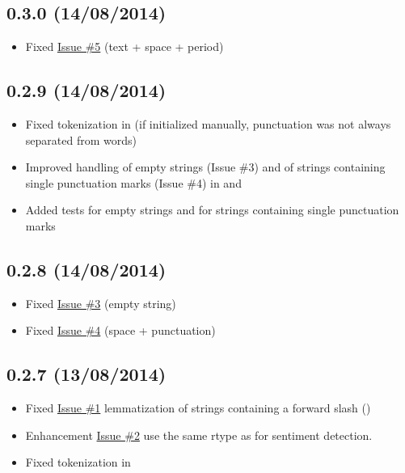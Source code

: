 \documentclass[letterpaper,10pt,english]{sphinxmanual}
\begin{document}
\subsection{0.3.0 (14/08/2014)}
\label{changelog:id2}\begin{itemize}
\item {} 
Fixed \href{https://github.com/markuskiller/textblob-de/issues/5}{Issue \#5} (text + space + period)

\end{itemize}


\subsection{0.2.9 (14/08/2014)}
\label{changelog:id3}\begin{itemize}
\item {} 
Fixed tokenization in  (if initialized manually, punctuation was not always separated from words)

\item {} 
Improved handling of empty strings (Issue \#3) and of strings containing single punctuation marks (Issue \#4) in  and 

\item {} 
Added tests for empty strings and for strings containing single punctuation marks

\end{itemize}


\subsection{0.2.8 (14/08/2014)}
\label{changelog:id4}\begin{itemize}
\item {} 
Fixed \href{https://github.com/markuskiller/textblob-de/issues/3}{Issue \#3} (empty string)

\item {} 
Fixed \href{https://github.com/markuskiller/textblob-de/issues/4}{Issue \#4} (space + punctuation)

\end{itemize}


\subsection{0.2.7 (13/08/2014)}
\label{changelog:id5}\begin{itemize}
\item {} 
Fixed \href{https://github.com/markuskiller/textblob-de/issues/1}{Issue \#1} lemmatization of strings containing a forward slash (\code{/})

\item {} 
Enhancement \href{https://github.com/markuskiller/textblob-de/issues/2}{Issue \#2} use the same rtype as  for sentiment detection.

\item {} 
Fixed tokenization in 

\end{itemize}
\end{document}
